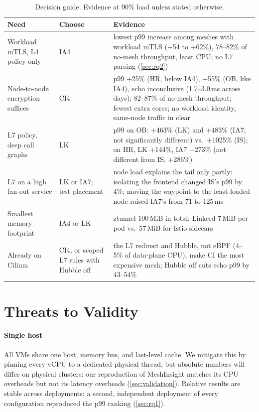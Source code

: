 \begin{table}[t]
  \centering
  \caption{Decision guide. Evidence at 90\% load unless stated otherwise.}
  \label{tab:guide}
  \footnotesize
  \setlength{\tabcolsep}{3pt}
  \begin{tabular}{@{}>{\raggedright\arraybackslash}p{}>{\raggedright\arraybackslash}p{}>{\raggedright\arraybackslash}p{}@{}}
    \toprule
    Need & Choose & Evidence \\
    \midrule
    Workload mTLS, L4 policy only & IA4 & lowest p99 increase among meshes with
      workload mTLS (+54 to +62\%), 78--82\% of no-mesh throughput, least CPU;
      no L7 parsing (\cref{sec:rq2}) \\
    Node-to-node encryption suffices & CI4 & p99 +25\% (HR, below IA4), +55\%
      (OB, like IA4), echo inconclusive (1.7--3.0\,ms across days); 82--87\% of no-mesh throughput; fewest
      extra cores; no workload identity, same-node traffic in clear \\
    L7 policy, deep call graphs & LK & p99 on OB: +463\% (LK) and +483\%
      (IA7; not significantly different) vs.\ +1025\% (IS); on HR, LK +144\%,
      IA7 +273\% (not different from IS, +286\%) \\
    L7 on a high fan-out service & LK or IA7; test placement & node load
      explains the tail only partly: isolating the frontend changed IS's p99 by
      4\%; moving the waypoint to the least-loaded node raised IA7's from 71 to
      125\,ms \\
    Smallest memory footprint & IA4 or LK & ztunnel 100\,MiB in total; Linkerd
      7\,MiB per pod vs.\ 57\,MiB for Istio sidecars \\
    Already on Cilium & CI4, or scoped L7 rules with Hubble off & the L7
      redirect and Hubble, not eBPF (4--5\% of data-plane CPU), make CI the
      most expensive mesh; Hubble off cuts echo p99 by 43--54\% \\
    \bottomrule
  \end{tabular}
\end{table}

\section{Threats to Validity}
\label{sec:threats}

\paragraph{Single host}
All VMs share one host, memory bus, and last-level cache. We mitigate this by
pinning every vCPU to a dedicated physical thread, but absolute numbers will
differ on physical clusters: our reproduction of MeshInsight matches its CPU
overheads but not its latency overheads (\cref{sec:validation}). Relative results are stable across deployments: a second,
independent deployment of every configuration reproduced the p99 ranking
(\cref{sec:rq1}).

